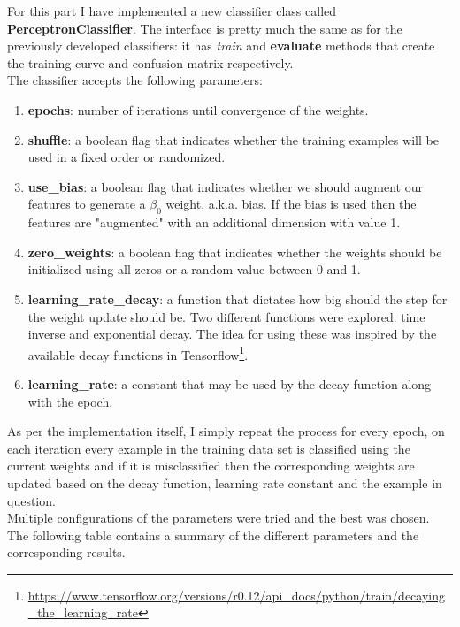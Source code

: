 \documentclass[11pt]{article}
\begin{document}
For this part I have implemented a new classifier class called \textbf{PerceptronClassifier}. The interface is pretty much the same as for the previously developed classifiers: it has \textit{train} and \textbf{evaluate} methods that create the training curve and confusion matrix respectively. \\
The classifier accepts the following parameters: 
\begin{enumerate}
\item \textbf{epochs}: number of iterations until convergence of the weights.

\item \textbf{shuffle}: a boolean flag that indicates whether the training examples will be used in a fixed order or randomized.

\item \textbf{use\_bias}: a boolean flag that indicates whether we should augment our features to generate a $\beta_0$ weight, a.k.a. bias. If the bias is used then the features are "augmented" with an additional dimension with value 1. 

\item \textbf{zero\_weights}: a boolean flag that indicates whether the weights should be initialized using all zeros or a random value between 0 and 1.

\item \textbf{learning\_rate\_decay}: a function that dictates how big should the step for the weight update should be. Two different functions were explored: time inverse and exponential decay. The idea for using these was inspired by the available decay functions in Tensorflow\footnote{\url{https://www.tensorflow.org/versions/r0.12/api_docs/python/train/decaying_the_learning_rate}}. 

\item \textbf{learning\_rate}: a constant that may be used by the decay function along with the epoch.
\end{enumerate}

As per the implementation itself, I simply repeat the process for every epoch, on each iteration every example in the training data set is classified using the current weights and if it is misclassified then the corresponding weights are updated based on the decay function, learning rate constant and the example in question.\\

Multiple configurations of the parameters were tried and the best was chosen. The following table contains a summary of the different parameters and the corresponding results.
\end{document}
